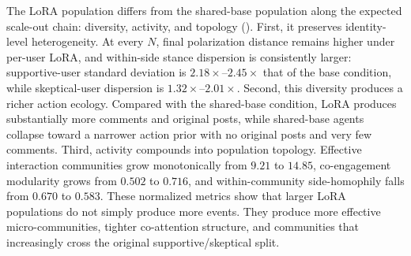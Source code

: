 The LoRA population differs from the shared-base population along the expected scale-out chain: diversity, activity, and topology (). First, it preserves identity-level heterogeneity. At every \(N\), final polarization distance remains higher under per-user LoRA, and within-side stance dispersion is consistently larger: supportive-user standard deviation is \(2.18\times\)--\(2.45\times\) that of the base condition, while skeptical-user dispersion is \(1.32\times\)--\(2.01\times\). Second, this diversity produces a richer action ecology. Compared with the shared-base condition, LoRA produces substantially more comments and original posts, while shared-base agents collapse toward a narrower action prior with no original posts and very few comments. Third, activity compounds into population topology. Effective interaction communities grow monotonically from \(9.21\) to \(14.85\), co-engagement modularity grows from \(0.502\) to \(0.716\), and within-community side-homophily falls from \(0.670\) to \(0.583\). These normalized metrics show that larger LoRA populations do not simply produce more events. They produce more effective micro-communities, tighter co-attention structure, and communities that increasingly cross the original supportive/skeptical split.



